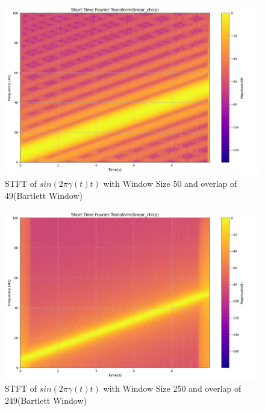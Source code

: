 \documentclass[12pt,a4paper,onecolumn]{exam}
\begin{document}
\begin{solution}
\begin{itemize}
\begin{itemize}
        \begin{figure}[H]
        \centering
        \includegraphics[scale = 0.35]{linear_chirp_1_50.0.png}
        \caption{STFT of $sin(2\pi\gamma(t)t)$ with Window Size 50 and overlap of 49(Bartlett Window)}
        \label{fig:7}
        \end{figure}

        \begin{figure}[H]
        \centering
        \includegraphics[scale = 0.35 ]{linear_chirp_1_250.0.png}
        \caption{STFT of $sin(2\pi\gamma(t)t)$ with Window Size 250 and overlap of 249(Bartlett Window)}
        \label{fig:8}
        \end{figure}


\end{itemize}
\end{itemize}
\end{solution}
\end{document}
